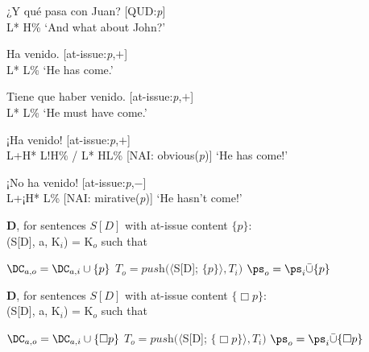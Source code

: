 \begin{exe} 
\ex \label{ex:havenidoOBV2} 
	\begin{xlist}[A:]
	 ¿Y qué pasa con Juan? \hfill [QUD:\textit{p}] \\
	\hspace*{7em} L* H\% 
	\glt `And what about John?' 
	\end{xlist}
	\begin{xlist}
		\ex 
		\begin{xlist}[A:]
		 Ha venido. \hfill [at-issue:\textit{p},$+$] \\
		\hspace*{2.5em} L* L\% 
		\glt `He has come.' 
		\end{xlist}
		
		\ex 
		\begin{xlist}[A:]
		 Tiene que haber venido. \hfill [at-issue:\textit{p},$+$] \\
		\hspace*{7.5em} L* L\%
		\glt `He must have come.'
		\end{xlist}
		
		\ex 
		\begin{xlist}[A:]
		 ¡Ha venido! \hfill [at-issue:\textit{p},$+$] \\
		\hspace*{1em} L+H* L!H\% / L* HL\% \hfill [\ac{NAI}: obvious(\textit{p})]
		\glt `He has come!'
		\end{xlist}
		
		\ex 
		\begin{xlist}[A:]
		 ¡No ha venido! \hfill [at-issue:\textit{p},$-$] \\
		\hspace*{2em} L+¡H* L\% \hfill [\ac{NAI}: mirative(\textit{p})] 
		\glt `He hasn't come!'
		\end{xlist}
	\end{xlist}

\ex\label{ex:declarativeoperatorrevised2indicative} \textbf{D}, for sentences $S[D]$ with at-issue content $\{ p \}$:\\
	(S[D], a, K$_{i}$) = K$_{o}$ such that
	\begin{xlist}
		\ex $\DC_{a,o} = \DC_{a,i}\cup \{ p \}$ 
		\ex $T_{o} = \textit{push}(\langle$S[D]; $\{ p \}\rangle, T_{i})$
		\ex $\ps_{o} = \ps_{i}\bar{\cup}\{ p \}$ 
	\end{xlist}

\ex\label{ex:declarativeoperatorrevised2indicativeTIENEQUE} \textbf{D}, for sentences $S[D]$ with at-issue content $\{ \Box p \}$:\\
	(S[D], a, K$_{i}$) = K$_{o}$ such that 
	\begin{xlist}
		\ex $\DC_{a,o} = \DC_{a,i}\cup \{ \Box p \}$ 
		\ex $T_{o} = \textit{push}(\langle$S[D]; $\{ \Box p \}\rangle, T_{i})$
		\ex $\ps_{o} = \ps_{i}\bar{\cup}\{ \Box p \}$ 
	\end{xlist}


\end{exe}
